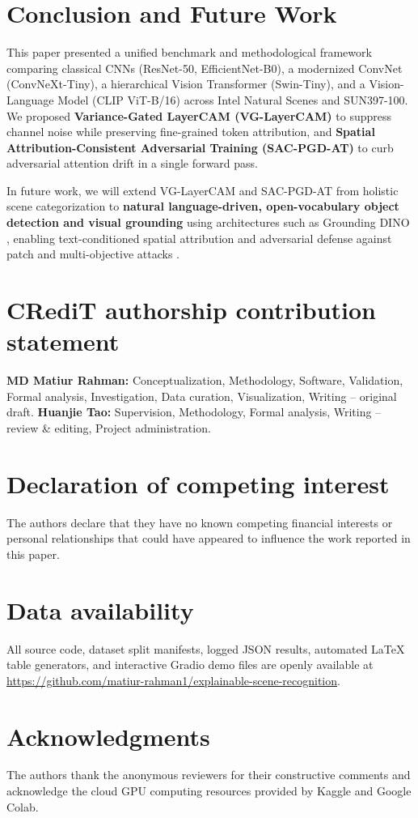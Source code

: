 \documentclass[final,5p,times,twocolumn]{elsarticle}
\begin{document}
\section{Conclusion and Future Work}
\label{sec:conclusion}
This paper presented a unified benchmark and methodological framework comparing classical CNNs (ResNet-50, EfficientNet-B0), a modernized ConvNet (ConvNeXt-Tiny), a hierarchical Vision Transformer (Swin-Tiny), and a Vision-Language Model (CLIP ViT-B/16) across Intel Natural Scenes and SUN397-100. We proposed \textbf{Variance-Gated LayerCAM (VG-LayerCAM)} to suppress channel noise while preserving fine-grained token attribution, and \textbf{Spatial Attribution-Consistent Adversarial Training (SAC-PGD-AT)} to curb adversarial attention drift in a single forward pass.

In future work, we will extend VG-LayerCAM and SAC-PGD-AT from holistic scene categorization to \textbf{natural language-driven, open-vocabulary object detection and visual grounding} using architectures such as Grounding DINO \cite{liu2024grounding}, enabling text-conditioned spatial attribution and adversarial defense against patch and multi-objective attacks \cite{tang2024adversarial,sun2023multiobjective}.

\FloatBarrier

\section*{CRediT authorship contribution statement}
\textbf{MD Matiur Rahman:} Conceptualization, Methodology, Software, Validation, Formal analysis, Investigation, Data curation, Visualization, Writing -- original draft. \textbf{Huanjie Tao:} Supervision, Methodology, Formal analysis, Writing -- review \& editing, Project administration.

\section*{Declaration of competing interest}
The authors declare that they have no known competing financial interests or personal relationships that could have appeared to influence the work reported in this paper.

\section*{Data availability}
All source code, dataset split manifests, logged JSON results, automated LaTeX table generators, and interactive Gradio demo files are openly available at \url{https://github.com/matiur-rahman1/explainable-scene-recognition}.

\section*{Acknowledgments}
The authors thank the anonymous reviewers for their constructive comments and acknowledge the cloud GPU computing resources provided by Kaggle and Google Colab.



\end{document}
